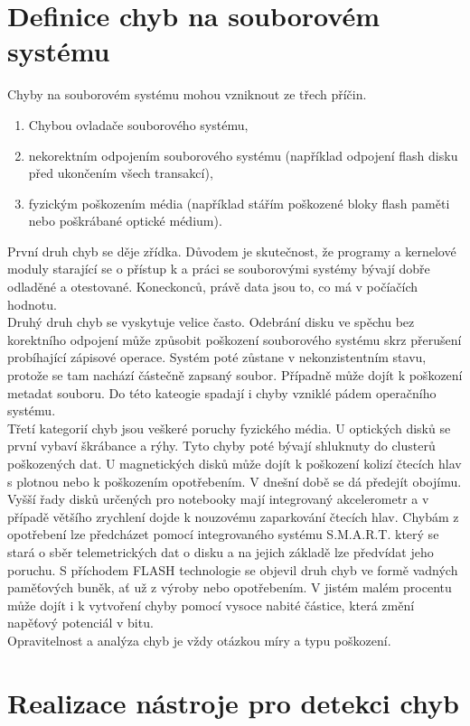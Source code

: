 \chapter{Definice chyb na souborovém systému}
Chyby na souborovém systému mohou vzniknout ze třech příčin. 
\begin{enumerate}
    \item Chybou ovladače souborového systému,
    \item nekorektním odpojením souborového systému (například odpojení flash disku před ukončením všech transakcí),
    \item fyzickým poškozením média (například stářím poškozené bloky flash paměti nebo poškrábané optické médium).
\end{enumerate}
První druh chyb se děje zřídka. Důvodem je skutečnost, že programy a kernelové moduly starající se o přístup k a práci se souborovými systémy bývají dobře odladěné a otestované. Koneckonců, právě data jsou to, co má v počíačích hodnotu.\\
Druhý druh chyb se vyskytuje velice často. Odebrání disku ve spěchu bez korektního odpojení může způsobit poškození souborového systému skrz přerušení probíhající zápisové operace. Systém poté zůstane v nekonzistentním stavu, protože se tam nachází částečně zapsaný soubor. Případně může dojít k poškození metadat souboru. Do této kateogie spadají i chyby vzniklé pádem operačního systému.\\
Třetí kategorií chyb jsou veškeré poruchy fyzického média. U optických disků se první vybaví škrábance a rýhy. Tyto chyby poté bývají shluknuty do clusterů poškozených dat. U magnetických disků může dojít k poškození kolizí čtecích hlav s plotnou nebo k poškozením opotřebením. V dnešní době se dá předejít obojímu. Vyšší řady disků určených pro notebooky mají integrovaný akcelerometr a v případě většího zrychlení dojde k nouzovému zaparkování čtecích hlav. Chybám z opotřebení lze předcházet pomocí integrovaného systému S.M.A.R.T. který se stará o sběr telemetrických dat o disku a na jejich základě lze předvídat jeho poruchu. S příchodem FLASH technologie se objevil druh chyb ve formě vadných paměťových buněk, ať už z výroby nebo opotřebením. V jistém malém procentu může dojít i k vytvoření chyby pomocí vysoce nabité částice, která změní napěťový potenciál v bitu.\\
Opravitelnost a analýza chyb je vždy otázkou míry a typu poškození. 

\chapter{Realizace nástroje pro detekci chyb}
